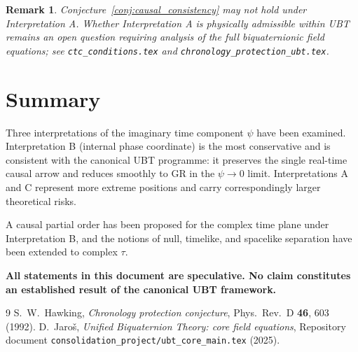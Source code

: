 \documentclass[12pt]{article}
\newtheorem{remark}{Remark}
\begin{document}
\begin{remark}
Conjecture~\ref{conj:causal_consistency} may not hold under
Interpretation A.  Whether Interpretation A is physically admissible
within UBT remains an open question requiring analysis of the full
biquaternionic field equations; see \texttt{ctc\_conditions.tex} and
\texttt{chronology\_protection\_ubt.tex}.
\end{remark}

\section{Summary}
Three interpretations of the imaginary time component $\psi$ have been
examined.  Interpretation B (internal phase coordinate) is the most
conservative and is consistent with the canonical UBT programme: it
preserves the single real-time causal arrow and reduces smoothly to GR
in the $\psi \to 0$ limit.  Interpretations A and C represent more
extreme positions and carry correspondingly larger theoretical risks.

A causal partial order has been proposed for the complex time plane under
Interpretation B, and the notions of null, timelike, and spacelike
separation have been extended to complex $\tau$.

\medskip
\noindent\textbf{All statements in this document are speculative.  No
claim constitutes an established result of the canonical UBT framework.}


\begin{thebibliography}{9}
  S.~W.~Hawking,
  \emph{Chronology protection conjecture},
  Phys.\ Rev.\ D \textbf{46}, 603 (1992).
  D.~Jaroš,
  \emph{Unified Biquaternion Theory: core field equations},
  Repository document \texttt{consolidation\_project/ubt\_core\_main.tex} (2025).
\end{thebibliography}
\end{document}
